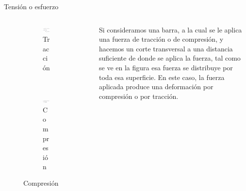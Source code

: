 \documentclass[11pt,handout,aspectratio=1610]{beamer}
\begin{document}
\begin{frame}{Tensión o esfuerzo}

    \begin{columns}
        \begin{column}{0.4\textwidth}
            \begin{figure}
                \centering
                \begin{subfigure}{\textwidth}
                    \includegraphics[width=\textwidth]{../figs/tracción.pdf}
                    \caption{Tracción}
                \end{subfigure}
                \\
                \begin{subfigure}{\textwidth}
                    \includegraphics[width=\textwidth]{../figs/compresion.pdf}
                    \caption{Compresión}
                \end{subfigure}
            \end{figure}
        \end{column}
        \begin{column}{0.6\textwidth}
            Si consideramos una barra, a la cual se le aplica una fuerza de tracción o de compresión, y hacemos un corte transversal a una distancia suficiente de donde se aplica la fuerza, tal como se ve en la figura esa fuerza se distribuye por toda esa superficie. En este caso, la fuerza aplicada produce una deformación por compresión o por tracción.


\end{column}
\end{columns}
\end{frame}
\end{document}
